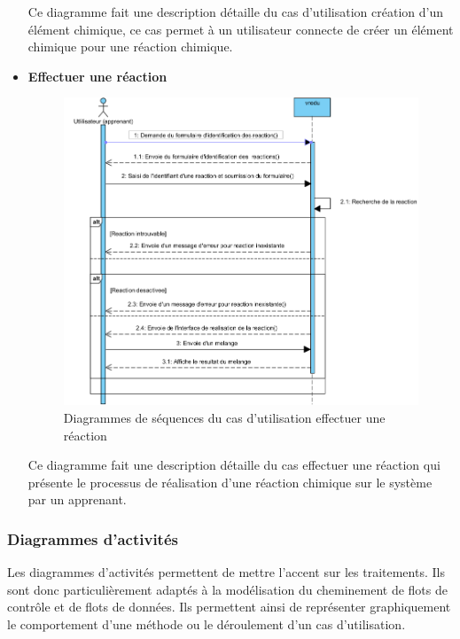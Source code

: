 \begin{itemize}
	      Ce diagramme fait une description détaille du cas d’utilisation création d’un élément chimique, ce cas permet à un utilisateur connecte de créer un élément chimique pour une réaction chimique.


	\item \textbf{Effectuer une réaction}

	      \begin{figure}[H]
		      \centering
		      \includegraphics[width=1\textwidth]{img/ucdeur}
		      \caption{Diagrammes de séquences du cas d'utilisation effectuer une réaction}
		      \label{fig:mesh1}
	      \end{figure}

	      Ce diagramme fait une description détaille du cas effectuer une réaction qui présente le processus de réalisation d’une réaction chimique sur le système par un apprenant.
\end{itemize}

\subsubsection{Diagrammes d’activités}

Les diagrammes d'activités permettent de mettre l'accent sur les traitements. Ils sont donc particulièrement adaptés à la modélisation du cheminement de flots de contrôle et de flots de données. Ils permettent ainsi de représenter graphiquement le comportement d'une méthode ou le déroulement d'un cas d'utilisation.

